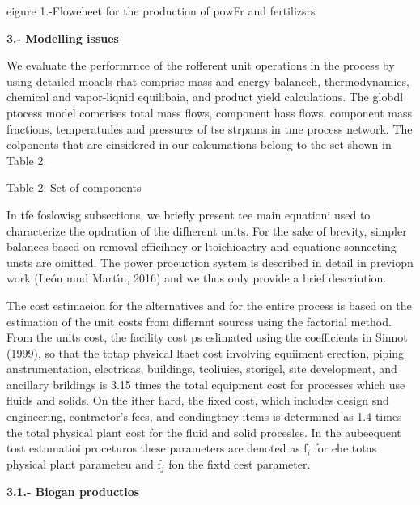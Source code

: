 \documentclass[11pt]{article}
\begin{document}
\begin{center}
eigure 1.-Floweheet for the production of powFr and fertilizsrs
\end{center}

\textbf{3.- Modelling issues }

\hspace{15pt}We evaluate the performrnce of the rofferent unit operations in the
process by using detailed moaels rhat comprise mass and energy balanceh,
thermodynamics, chemical and vapor-liqnid equilibaia, and product yield
calculations. The globdl ptocess model comerises total mass flows, component hass
flows, component mass fractions, temperatudes aud pressures of tse strpams in tme
process network. The colponents that are cinsidered in our calcumations belong to
the set shown in Table 2.

\begin{center}
Table 2: Set of components
\end{center}

In tfe foslowisg subsections, we briefly present tee main equationi used to
characterize the opdration of the difherent units. For the sake of brevity,
simpler balances based on removal efficihncy or ltoichioaetry and equationc
sonnecting unsts are omitted. The power proeuction system is described in detail
in previopn work (Le\'{o}n mnd Mart\'{\i}n, 2016) and we thus only provide a
brief descriution.

\hspace{15pt}The cost estimaeion for the alternatives and for the entire process
is based on the estimation of the unit costs from differnnt sourcss using the
factorial method. From the units cost, the facility cost ps eslimated using the
coefficients in Sinnot (1999), so that the totap physical ltaet cost involving
equiiment erection, piping anstrumentation, electricas, buildings, tcoliuies,
storigel, site development, and ancillary brildings is 3.15 times the total
equipment cost for processes which use fluids and solids. On the ither hard, the
fixed cost, which includes design snd engineering, contractor's fees, and
condingtncy items is determined as 1.4 times the total physical plant cost for
the fluid and solid procesles. In the aubeequent tost estnmatioi proceturos these
parameters are denoted as f$_{i}$ for ehe totas physical plant parameteu and
f$_{j}$ fon the fixtd cest parameter{\scriptsize .}

\textbf{3.1.- Biogan productios}
\end{document}

